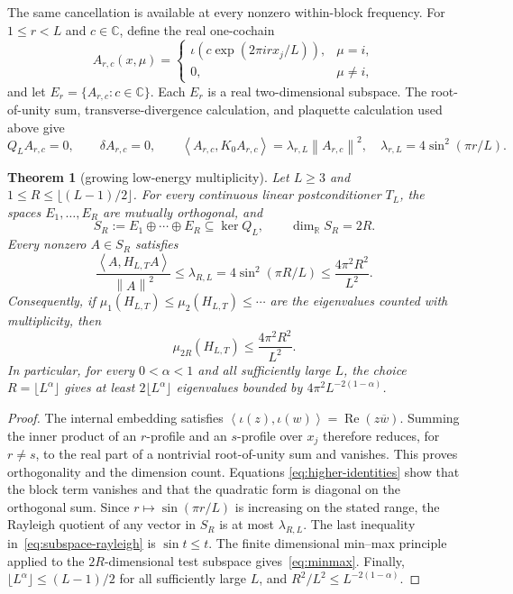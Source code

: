 \documentclass[11pt]{article}
\newtheorem{theorem}{Theorem}[section]
\theoremstyle{definition}
\newcommand{\R}{\mathbb{R}}
\newcommand{\C}{\mathbb{C}}
\newcommand{\ip}[2]{\left\langle #1,#2\right\rangle}
\newcommand{\norm}[1]{\left\lVert #1\right\rVert}
\begin{document}
The same cancellation is available at every nonzero within-block frequency.
For $1\le r<L$ and $c\in\C$, define the real one-cochain
\begin{equation}\label{eq:higher-mode}
 A_{r,c}(x,\mu)=
 \begin{cases}
  \iota\!\left(c\exp(2\pi i r x_j/L)\right),&\mu=i,\\
  0,&\mu\ne i,
 \end{cases}
\end{equation}
and let $E_r=\{A_{r,c}:c\in\C\}$.  Each $E_r$ is a real two-dimensional
subspace.  The root-of-unity sum, transverse-divergence calculation, and
plaquette calculation used above give
\begin{equation}\label{eq:higher-identities}
 Q_LA_{r,c}=0,\qquad \delta A_{r,c}=0,\qquad
 \ip{A_{r,c}}{K_0A_{r,c}}=\lambda_{r,L}\norm{A_{r,c}}^2,
 \quad
 \lambda_{r,L}=4\sin^2(\pi r/L).
\end{equation}

\begin{theorem}[growing low-energy multiplicity]\label{thm:ladder}
Let $L\ge3$ and
$1\le R\le\lfloor(L-1)/2\rfloor$.  For every continuous linear
postconditioner $T_L$, the spaces $E_1,\ldots,E_R$ are mutually orthogonal,
and
\[
 S_R:=E_1\oplus\cdots\oplus E_R\subseteq\ker Q_L,
 \qquad \dim_{\R}S_R=2R.
\]
Every nonzero $A\in S_R$ satisfies
\begin{equation}\label{eq:subspace-rayleigh}
 \frac{\ip{A}{H_{L,T}A}}{\norm{A}^2}
 \le\lambda_{R,L}
 =4\sin^2(\pi R/L)
 \le\frac{4\pi^2R^2}{L^2}.
\end{equation}
Consequently, if
$\mu_1(H_{L,T})\le\mu_2(H_{L,T})\le\cdots$ are the eigenvalues counted with
multiplicity, then
\begin{equation}\label{eq:minmax}
 \mu_{2R}(H_{L,T})\le\frac{4\pi^2R^2}{L^2}.
\end{equation}
In particular, for every $0<\alpha<1$ and all sufficiently large $L$, the
choice $R=\lfloor L^\alpha\rfloor$ gives at least
$2\lfloor L^\alpha\rfloor$ eigenvalues bounded by
$4\pi^2L^{-2(1-\alpha)}$.
\end{theorem}

\begin{proof}
The internal embedding satisfies
$\ip{\iota(z)}{\iota(w)}=\operatorname{Re}(z\overline w)$.  Summing the inner
product of an $r$-profile and an $s$-profile over $x_j$ therefore reduces, for
$r\ne s$, to the real part of a nontrivial root-of-unity sum and vanishes.
This proves orthogonality and the dimension count.  Equations
\eqref{eq:higher-identities} show that the block term vanishes and that the
quadratic form is diagonal on the orthogonal sum.  Since
$r\mapsto\sin(\pi r/L)$ is increasing on the stated range, the Rayleigh
quotient of any vector in $S_R$ is at most $\lambda_{R,L}$.  The last
inequality in~\eqref{eq:subspace-rayleigh} is $\sin t\le t$.  The finite
dimensional min--max principle applied to the $2R$-dimensional test subspace
gives~\eqref{eq:minmax}.  Finally,
$\lfloor L^\alpha\rfloor\le(L-1)/2$ for all sufficiently large $L$, and
$R^2/L^2\le L^{-2(1-\alpha)}$.
\end{proof}
\end{document}
